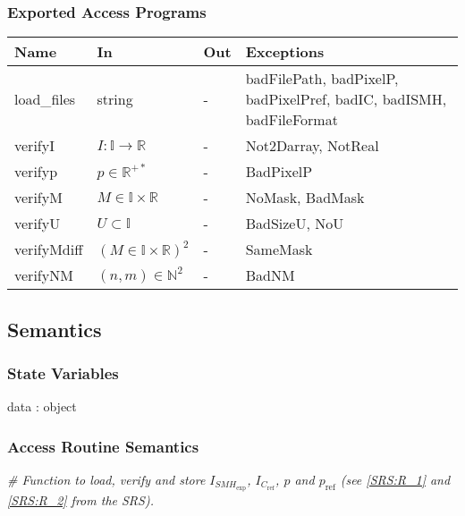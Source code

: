 \documentclass[12pt, titlepage]{article}
\begin{document}
\subsubsection{Exported Access Programs}

\begin{center}
\begin{tabular}{p{2cm} p{3cm} p{1cm} p{7cm}}
\hline
\textbf{Name} & \textbf{In} & \textbf{Out} & \textbf{Exceptions} \\
\hline
load{\_}files & string & - & badFilePath, badPixelP, badPixelPref, badIC, 
badISMH, badFileFormat \\
verifyI & $I:\mathbb{I}\rightarrow\mathbb{R}$ & - & Not2Darray, NotReal\\
verifyp & $p \in \mathbb{R}^{+*}$ & - & BadPixelP\\
verifyM & $M \in \mathbb{I} \times \mathbb{R}$ & - & NoMask, BadMask \\
verifyU & $U \subset \mathbb{I}$ & - & BadSizeU, NoU \\
verifyMdiff & $(M \in \mathbb{I} \times \mathbb{R})^2$ & - & SameMask \\
verifyNM & $(n,m)\in\mathbb{N}^2$ & - & BadNM\\
\hline
\end{tabular}
\end{center}

\subsection{Semantics}

\subsubsection{State Variables}

data : object

\subsubsection{Access Routine Semantics}

\noindent\textit{{\#} Function to load, verify and store 
$I_{\mathit{SMH}_{\text{exp}}}$, $I_{C_{\text{ref}}}$, $p$ and $p_{\text{ref}}$ 
(see \cref{SRS:R_1} and \cref{SRS:R_2} from the SRS).}
\medskip
\end{document}
